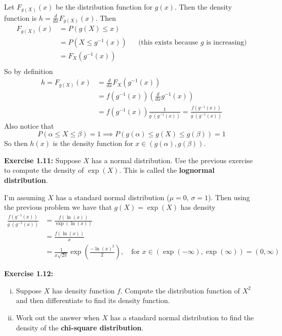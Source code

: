 \begin{mdframed}
    Let $F_{g(X)}(x)$ be the distribution function for $g(x)$. Then the density function is $h = \frac{d}{dx}F_{g(X)}(x)$. Then  
    \begin{align*}
        F_{g(X)}(x) &= P(g(X) \leq x) \\
        &= P(X \leq g^{-1}(x)) && \text{(this exists because $g$ is increasing)} \\
        &= F_X(g^{-1}(x)) \\
    \end{align*}
    So by definition 
    \begin{align*}
        h = F_{g(X)}(x) &= \frac{d}{dx}F_X(g^{-1}(x)) \\
        &=f(g^{-1}(x)) \left(\frac{d}{dx}g^{-1}(x) \right)\\
        &=f(g^{-1}(x))\frac{1}{g^\prime(g^{-1}(x))} = \frac{f(g^{-1}(x))}{g^\prime(g^{-1}(x))} 
    \end{align*}
    Also notice that 
    \[P(\alpha \leq X \leq \beta)=1 \implies P(g(\alpha) \leq g(X) \leq g(\beta)) = 1\]
    So then $h(x)$ is the density function for $x \in (g(\alpha), g(\beta))$.
\end{mdframed}
\textbf{Exercise 1.11:} Suppose $X$ has a normal distribution. Use the previous exercise to compute the density of $\exp(X)$. This is called the \textbf{lognormal distribution}.
\begin{mdframed}
    I'm assuming $X$ has a standard normal distribution ($\mu = 0, \, \sigma=1$). Then using the previous problem we have that $g(X) = \exp(X)$ has density
    \begin{align*}
        \frac{f(g^{-1} (x))}{g^\prime(g^{-1}(x))} &= \frac{f(\ln(x))}{\exp(\ln(x))}\\
        &= \frac{f(\ln(x))}{x} \\
        &= \frac{1}{x\sqrt{2\pi}}\exp\left(\frac{-\ln(x)^2}{2}\right), \quad \text{for $x \in (\exp(-\infty), \exp(\infty)) = (0, \infty)$}
    \end{align*}
\end{mdframed}
\textbf{Exercise 1.12:} 
\begin{enumerate}[i)]
    \item Suppose $X$ has density function $f$. Compute the distribution function of $X^2$ and then differentiate to find its density function.
    \item Work out the answer when $X$ has a standard normal distribution to find the density of the \textbf{chi-square distribution}.
\end{enumerate}
\begin{mdframed}
    
\end{mdframed}




